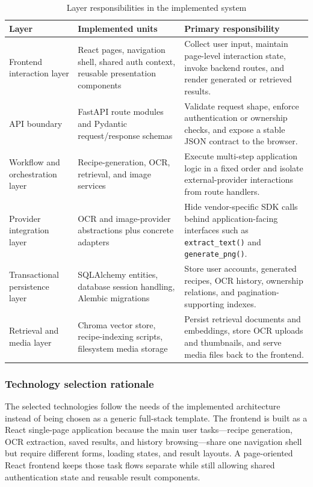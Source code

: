 \begin{table}[H]
	\centering
	\scriptsize
	\renewcommand{\arraystretch}{1.2}
	\begin{tabularx}{\textwidth}{|p{2.8cm}|p{4.4cm}|X|}
		\hline
		\textbf{Layer} & \textbf{Implemented units} & \textbf{Primary responsibility} \\
		\hline
		Frontend interaction layer & React pages, navigation shell, shared auth context, reusable presentation components & Collect user input, maintain page-level interaction state, invoke backend routes, and render generated or retrieved results. \\
		\hline
		API boundary & FastAPI route modules and Pydantic request/response schemas & Validate request shape, enforce authentication or ownership checks, and expose a stable JSON contract to the browser. \\
		\hline
		Workflow and orchestration layer & Recipe-generation, OCR, retrieval, and image services & Execute multi-step application logic in a fixed order and isolate external-provider interactions from route handlers. \\
		\hline
		Provider integration layer & OCR and image-provider abstractions plus concrete adapters & Hide vendor-specific SDK calls behind application-facing interfaces such as \texttt{extract\_text()} and \texttt{generate\_png()}. \\
		\hline
		Transactional persistence layer & SQLAlchemy entities, database session handling, Alembic migrations & Store user accounts, generated recipes, OCR history, ownership relations, and pagination-supporting indexes. \\
		\hline
		Retrieval and media layer & Chroma vector store, recipe-indexing scripts, filesystem media storage & Persist retrieval documents and embeddings, store OCR uploads and thumbnails, and serve media files back to the frontend. \\
		\hline
	\end{tabularx}
\caption{Layer responsibilities in the implemented system}
	\label{tab:layer-responsibilities}
\end{table}

\subsubsection{Technology selection rationale}

The selected technologies follow the needs of the implemented
architecture instead of being chosen as a generic full-stack template.
The frontend is built as a React single-page application because the
main user tasks---recipe generation, OCR extraction, saved results, and
history browsing---share one navigation shell but require different
forms, loading states, and result layouts. A page-oriented React
frontend keeps those task flows separate while still allowing shared
authentication state and reusable result components.

